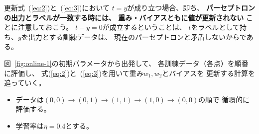 更新式~(\ref{eq:2})と~(\ref{eq:3})において
$t = y$が成り立つ場合、即ち、
\textbf{パーセプトロンの出力とラベルが一致する時には、
  重み・バイアスともに値が更新されない}
ことに注意しておこう。
$t - y = 0$が成立するということは、
$t$をラベルとして持ち、$y$を出力とする訓練データは、
現在のパーセプトロンと矛盾しないからである。

図~\ref{fig:online-1}の初期パラメータから出発して、
各訓練データ（各点）を順番に評価し、
式(\ref{eq:2})と~(\ref{eq:3})を用いて重み$w_1, w_2$とバイアスを
更新する計算を追っていく。
\begin{itemize}
\item データは$(0, 0) \to (0, 1) \to (1, 1) \to (1, 0)\to (0, 0)$の順で
  循環的に評価する。
\item 学習率は$\eta = 0.4$とする。 
\end{itemize}

